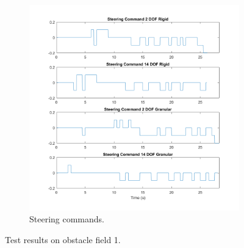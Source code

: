 \documentclass[12pt,twocolumn]{article}
\begin{document}
\begin{figure}
\begin{subfigure}[b]{\columnwidth}
		\includegraphics[width=\columnwidth]{Figs/SteeringCommandsField1.png}
		\caption{\small Steering commands.}   
		\label{fig:SteeringCommandsField1}
	\end{subfigure}
	\caption{\small Test results on obstacle field 1.}
	\label{fig:Obst1TestData}
\end{figure}
\end{document}
